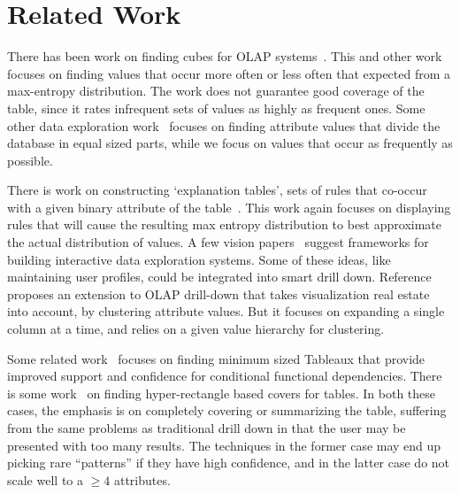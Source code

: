 \documentclass[10pt,journal,compsoc]{IEEEtran}
\newcounter{prob}
\begin{document}
\vspace{-10pt}
\section{Related Work}\label{sec:related}

There has been work on finding cubes for OLAP systems~\cite{Sarawagi:2001:UMA:767141.767148, Sarawagi00user-adaptiveexploration, Sarawagi98discovery-drivenexploration}. This and other work~\cite{Mampaey:2011:TMI:2020408.2020499} focuses on finding values that occur more often or less often that expected from a max-entropy distribution. The work does not guarantee good coverage of the table, since it rates infrequent sets of values as highly as frequent ones. Some other data exploration work~\cite{sellam:meet} focuses on finding attribute values that divide the database in equal sized parts, while we focus on values that occur as frequently as possible. 

There is work on constructing `explanation tables', sets of rules that co-occur with a given binary attribute of the table~\cite{DBLP:journals/pvldb/GebalyAGKS14}. This work again focuses on displaying rules that will cause the resulting max entropy distribution to best approximate the actual distribution of values. A few vision papers~\cite{data-deluge, cetintemel2013query} suggest frameworks for building interactive data exploration systems. Some of these ideas, like maintaining user profiles, could be integrated into smart drill down. Reference~\cite{DBLP:conf/edbt/CandanCQS09} proposes an extension to OLAP drill-down that takes visualization real estate into account, by clustering attribute values. But it focuses on expanding a single column at a time, and relies on a given value hierarchy for clustering.

Some related work~\cite{DBLP:journals/debu/GolabKS11, Golab:2008:GNT:1453856.1453900} focuses on finding minimum sized Tableaux that provide improved support and confidence for conditional functional dependencies. There is some work~\cite{Bu:2005:MSH:1083592.1083644, Lakshmanan:2002:GMA:1287369.1287435, DBLP:conf:kdd:XiangJFD08, Geerts04tilingdatabases} on finding hyper-rectangle based covers for tables. In both these cases, the emphasis is on completely covering or 
summarizing the table, suffering from the same problems as traditional drill down in that the user may be presented with
too many results. The techniques in the former case may end up picking rare ``patterns'' if they have high confidence, and in the latter case do not scale well to a $\geq 4$ attributes. 
\end{document}
